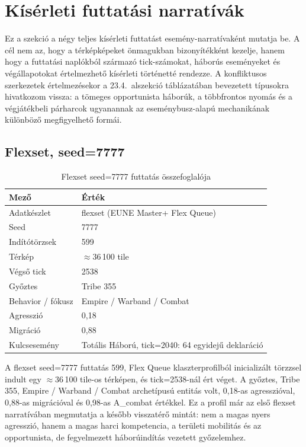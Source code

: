 ﻿\documentclass[a4paper,12pt]{report}
\begin{document}
\section{Kísérleti futtatási narratívák}
\label{sec:neurosim-26-runs}

Ez a szekció a négy teljes kísérleti futtatást esemény-narratívaként mutatja be. A cél nem az, hogy a térképképeket önmagukban bizonyítékként kezelje, hanem hogy a futtatási naplókból származó tick-számokat, háborús eseményeket és végállapotokat értelmezhető kísérleti történetté rendezze. A konfliktusos szerkezetek értelmezésekor a 23.4.~alszekció táblázatában bevezetett típusokra hivatkozom vissza: a tömeges opportunista háborúk, a többfrontos nyomás és a végjátékbeli párharcok ugyanannak az eseménybusz-alapú mechanikának különböző megfigyelhető formái.

\subsection*{Flexset, seed=7777}

\begin{table}[h]
\centering
\caption{Flexset seed=7777 futtatás összefoglalója}
\label{tab:neurosim-run-fl7777-summary}
\begin{tabular}{ll}
\hline
\textbf{Mező} & \textbf{Érték} \\
\hline
Adatkészlet & flexset (EUNE Master+ Flex Queue) \\
Seed & 7777 \\
Indítótörzsek & 599 \\
Térkép & $\approx$36\,100 tile \\
Végső tick & 2538 \\
Győztes & Tribe 355 \\
Behavior / fókusz & Empire / Warband / Combat \\
Agresszió & 0,18 \\
Migráció & 0,88 \\
Kulcsesemény & Totális Háború, tick=2040: 64 egyidejű deklaráció \\
\hline
\end{tabular}
\end{table}

A flexset seed=7777 futtatás 599, Flex Queue klaszterprofilból inicializált törzzsel indult egy $\approx$36\,100 tile-os térképen, és tick=2538-nál ért véget. A győztes, Tribe 355, Empire / Warband / Combat archetípusú entitás volt, 0,18-as agresszióval, 0,88-as migrációval és 0,98-as A\_combat értékkel. Ez a profil már az első flexset narratívában megmutatja a később visszatérő mintát: nem a magas nyers agresszió, hanem a magas harci kompetencia, a területi mobilitás és az opportunista, de fegyelmezett háborúindítás vezetett győzelemhez.
\end{document}
